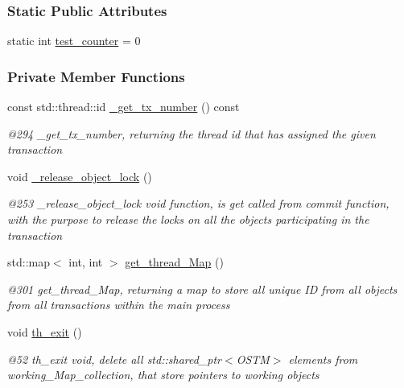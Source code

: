 \subsubsection*{Static Public Attributes}
\begin{DoxyCompactItemize}
\item 
static int \hyperlink{class_t_x_a25838234aab99ae891a90eb8623a8b3c_a25838234aab99ae891a90eb8623a8b3c}{test\+\_\+counter} = 0
\end{DoxyCompactItemize}
\subsubsection*{Private Member Functions}
\begin{DoxyCompactItemize}
\item 
const std\+::thread\+::id \hyperlink{class_t_x_a9eba04944d449285905b60ec47223cff_a9eba04944d449285905b60ec47223cff}{\+\_\+get\+\_\+tx\+\_\+number} () const 
\begin{DoxyCompactList}\small\item\em @294 \+\_\+get\+\_\+tx\+\_\+number, returning the thread id that has assigned the given transaction \end{DoxyCompactList}\item 
void \hyperlink{class_t_x_a4c13d2015dc15d0f788fa9a1413f0463_a4c13d2015dc15d0f788fa9a1413f0463}{\+\_\+release\+\_\+object\+\_\+lock} ()
\begin{DoxyCompactList}\small\item\em @253 \+\_\+release\+\_\+object\+\_\+lock void function, is get called from commit function, with the purpose to release the locks on all the objects participating in the transaction \end{DoxyCompactList}\item 
std\+::map$<$ int, int $>$ \hyperlink{class_t_x_a3f5671423cb7b9f9c98f8a25f2a4b545_a3f5671423cb7b9f9c98f8a25f2a4b545}{get\+\_\+thread\+\_\+\+Map} ()
\begin{DoxyCompactList}\small\item\em @301 get\+\_\+thread\+\_\+\+Map, returning a map to store all unique ID from all objects from all transactions within the main process \end{DoxyCompactList}\item 
void \hyperlink{class_t_x_ae045534c4a9d39bd5c6ea2a39a372a79_ae045534c4a9d39bd5c6ea2a39a372a79}{th\+\_\+exit} ()
\begin{DoxyCompactList}\small\item\em @52 th\+\_\+exit void, delete all std\+::shared\+\_\+ptr$<$\+O\+S\+T\+M$>$ elements from working\+\_\+\+Map\+\_\+collection, that store pointers to working objects \end{DoxyCompactList}\end{DoxyCompactItemize}
